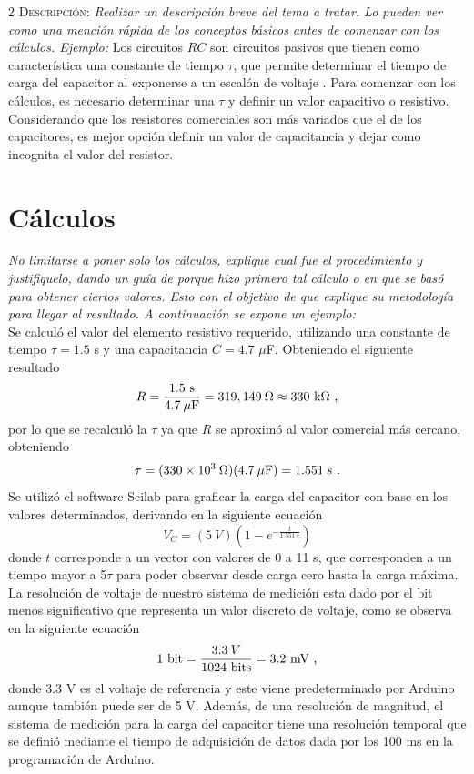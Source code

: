 \documentclass[11pt,letterpaper]{article}
\begin{document}
\begin{multicols}{2}
\textsc{Descripción:} \textit{Realizar un descripción breve del tema a tratar. Lo pueden ver como una mención rápida de los conceptos básicos antes de comenzar con los cálculos. Ejemplo:} Los circuitos $RC$ son circuitos pasivos que tienen como característica una constante de tiempo $\tau$, que permite determinar el tiempo de carga del capacitor al exponerse a un escalón de voltaje \cite{book1}. Para comenzar con los cálculos, es necesario determinar una $\tau$ y definir un valor capacitivo o resistivo.\\
Considerando que los resistores comerciales son más variados que el de los capacitores, es mejor opción definir un valor de capacitancia y dejar como incognita el valor del resistor.
\section{Cálculos}
\textit{No limitarse a poner solo los cálculos, explique cual fue el procedimiento y justifiquelo, dando un guía de porque hizo primero tal cálculo o en que se basó para obtener ciertos valores. Esto con el objetivo de que explique su metodología para llegar al resultado. A continuación se expone un ejemplo:}\\
Se calculó el valor del elemento resistivo requerido, utilizando una constante de tiempo $\tau = 1.5$ s y una capacitancia $C = 4.7$ $\mu$F. Obteniendo el siguiente resultado
\begin{equation}
R = \frac{1.5\textup{ s}}{4.7 \: \mu \textup{F}} = 319,149 \: \Omega \approx 330\textup{ k}\Omega \textup{ ,}
\end{equation}
por lo que se recalculó la $\tau$ ya que $R$ se aproximó al valor comercial más cercano, obteniendo
\begin{equation}
\tau = (330\times 10^{3}\:\Omega)(4.7 \: \mu\textup{F}) = 1.551 \: s \textup{ .}
\end{equation}  
Se utilizó el software Scilab para graficar la carga del capacitor con base en los valores determinados, derivando en la siguiente ecuación
\begin{equation}
V_C = (5\:V) \left(1 - e^{- \frac{t}{1.551 \:s}}\right) 
\end{equation}
donde $t$ corresponde a un vector con valores de 0 a 11 s, que corresponden a un tiempo mayor a 5$\tau$ para poder observar desde carga cero hasta la carga máxima.\\
La resolución de voltaje de nuestro sistema de medición esta dado por el bit menos significativo que representa un valor discreto de voltaje, como se observa en la siguiente ecuación
\begin{equation}
1 \textup{ bit} = \frac{3.3 \: V}{1024 \textup{ bits}} = 3.2 \textup{ mV ,}
\end{equation}
donde 3.3 V es el voltaje de referencia y este viene predeterminado por Arduino aunque también puede ser de 5 V. Además, de una resolución de magnitud, el sistema de medición para la carga del capacitor tiene una resolución temporal que se definió mediante el tiempo de adquisición de datos dada por los 100 ms en la programación de Arduino.

\end{multicols}
\end{document}
